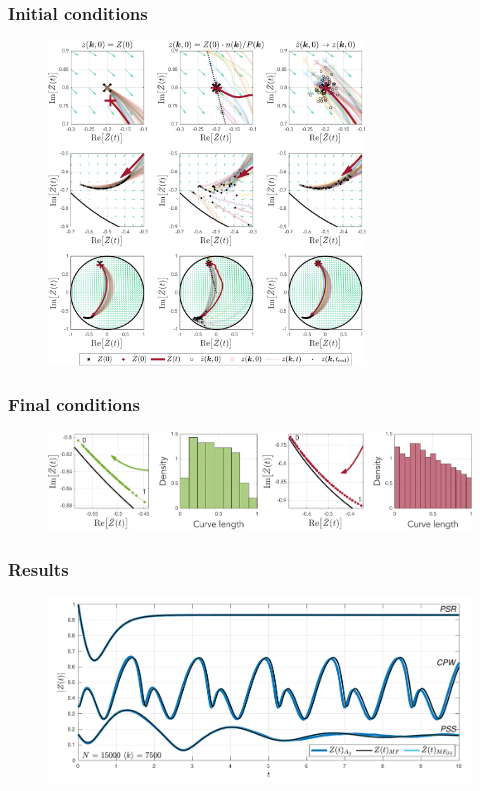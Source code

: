 \begin{frame}
\frametitle{Initial conditions} 
\begin{figure}[H]
\centering
\includegraphics[trim=0cm 8.5cm 0cm 0cm, clip=true, width = 0.75\textwidth]{../Figures/PhaseSpace/Mappings.pdf}
   \label{fig:mappings}
\end{figure}
\end{frame}

\begin{frame}
\frametitle{Final conditions} 
\begin{figure}[H]
\centering
\includegraphics[width = \textwidth]{../Figures/Distributions/FinalConditions.pdf}
\label{fig:FinalConditions}
\end{figure}
\end{frame}

\begin{frame}
\frametitle{Results} 
\begin{figure}[H]
\centering
\includegraphics[width = \textwidth, trim={0 3mm 0 3mm},clip]{../Figures/InspectMeanFieldFixedDegree.pdf}
\label{fig:InspectMeanFieldFixedDegree}
\end{figure}
\end{frame}

